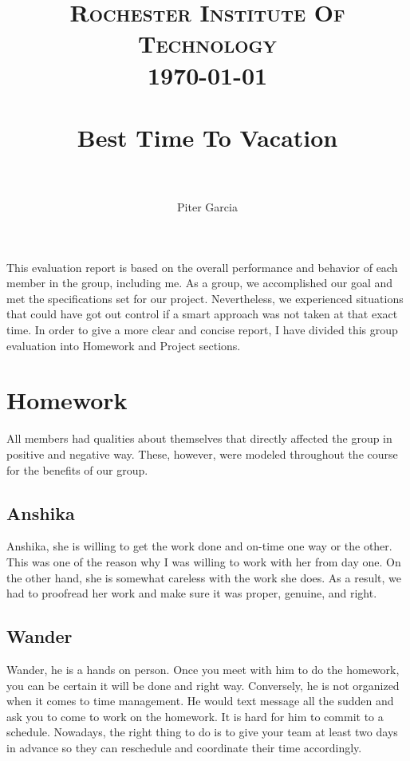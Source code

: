 \documentclass{sig-alternate}
\title{
		\vspace{-0.4in} 	
		\normalfont \normalsize \textsc{Rochester Institute Of Technology} \\ [15pt]
		\today\\
		\horrule{0.5pt} \\[0.4cm]
		\huge Best Time To Vacation \\
		\horrule{0.5pt} \\[0.4cm]
		\normalsize\vspace{-0.5in}
}
\author{
		\normalfont \normalsize\vspace{-0.6in}
        Piter Garcia\\[8pt]\normalsize
}
\begin{document}
\maketitle


\begin{normalsize}\normalfont \normalsize \textnormal{
This evaluation report is based on the overall performance and behavior of each member in the group, including me. As a group, we accomplished our goal and met the specifications set for our project. Nevertheless, we experienced situations that could have got out control if a smart approach was not taken at that exact time. In order to give a more clear and concise report, I have divided this group evaluation into Homework and Project sections.\newline}
\end{normalsize}

\section{Homework}
\label{homework}\normalfont \normalsize{
	All members had qualities about themselves that directly affected the group in positive and negative way. These, however, were modeled throughout the course for the benefits of our group.\newline}

	\subsection{Anshika}\normalfont \normalsize{
		Anshika, she is willing to get the work done and on-time one way or the other. This was one of the reason why I was willing to work with her from day one. On the other hand, she is somewhat careless with the work she does. As a result, we had to proofread her work and make sure it was proper, genuine, and right.\newline }


	\subsection{Wander}\normalfont \normalsize{
		Wander, he is a hands on person. Once you meet with him to do the homework, you can be certain it will be done and right way. Conversely, he is not organized when it comes to time management. He would text message all the sudden and ask you to come to work on the homework. It is hard for him to commit to a schedule. Nowadays, the right thing to do is to give your team at least two days in advance so they can reschedule and coordinate their time accordingly.\newline}
\end{document}
